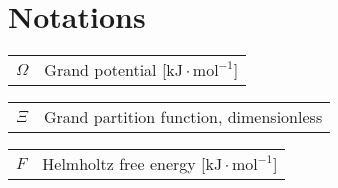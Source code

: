 {}
\setcounter{tocdepth}{2} %
\setcounter{secnumdepth}{3} %
\manualmark 
\markboth{\spacedlowsmallcaps{\contentsname}}{\spacedlowsmallcaps{\contentsname}} 
\tableofcontents  
{} 
\renewcommand{\chaptermark}[1]{\markboth{\spacedlowsmallcaps{#1}}{\spacedlowsmallcaps{#1}}} \renewcommand{\sectionmark}[1]{\markright{\thesection\enspace\spacedlowsmallcaps{#1}}} 

\clearpage{}

\begingroup
\let\clearpage\relax
\let\cleardoublepage\relax

{}
\listoffigures

\vspace{4ex}

{}
\listoftables

\vspace{4ex}

{}
\chapter*{Notations} 

\hspace{-0.5em}%
\begin{tabular}{>{\raggedright}p{3.3em}l}
$\varOmega$ & Grand potential {[}$\mathrm{kJ\cdot mol^{-1}}${]}\tabularnewline
\end{tabular}

\hspace{-1.5em}%
\begin{tabular}{>{\raggedright}p{3.3em}l}
$\varXi$ & Grand partition function, dimensionless\tabularnewline
\end{tabular}

\hspace{-1.5em}%
\begin{tabular}{>{\raggedright}p{3.3em}l}
$F$ & Helmholtz free energy {[}$\mathrm{kJ\cdot mol^{-1}}${]}\tabularnewline
\end{tabular}

